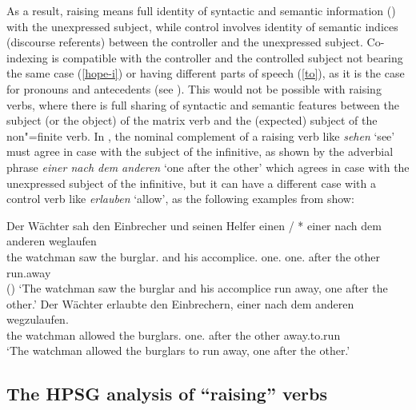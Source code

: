 As a result,  raising means full identity of syntactic and semantic
information ()  with the unexpressed subject, while
control involves identity of semantic indices (discourse referents) between the controller and the
unexpressed subject. Co-indexing is compatible with the controller and the controlled subject not
bearing the same case (\ref{hope-i}) or having different parts of speech (\ref{to}), as it is the
case for pronouns and antecedents (see ). This would not be possible
with raising verbs, where there is full sharing of syntactic and semantic features between the
subject (or the object) of the matrix verb and the (expected) subject of the non"=finite verb. In
, the nominal complement of a raising verb like \emph{sehen} `see' must agree in case
with the subject of the infinitive, as shown by the adverbial phrase \emph{einer nach dem anderen} `one after the other' which
agrees in case with the unexpressed subject of the infinitive, but it can have a different case with
a control verb like \emph{erlauben} `allow', as the following examples from  show: 


\eal
\label{german2}
\ex 
\gll Der Wächter  sah den Einbrecher     und seinen Helfer            einen       / *  einer nach dem anderen weglaufen\\
     the watchman saw the burglar.\ACC{} and his    accomplice.\ACC{} one.\ACC{} {} {} one.\NOM{} after the other run.away\\\hfill()
\glt `The watchman saw the burglar and his accomplice run away, one after the other.'
\ex
\gll Der Wächter erlaubte den Einbrechern, einer nach dem anderen wegzulaufen.\\
     the watchman  allowed the burglars.\DAT{} one.\NOM{} after the other away.to.run\\
\glt `The watchman allowed the burglars to run away, one after the other.'
\zl


\subsection{The HPSG analysis of ``raising'' verbs}
\label{control:sec-HPSG-anaylsis-of-raising}

